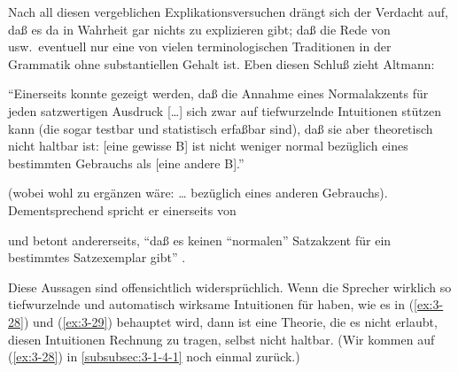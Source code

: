 \documentclass[output=paper]{langsci/langscibook}
\begin{document}
Nach all diesen vergeblichen Explikationsversuchen drängt sich der
Verdacht auf, daß es da in Wahrheit gar nichts zu explizieren gibt;
daß die Rede von  usw.\ eventuell nur eine von
vielen terminologischen Traditionen in der Grammatik ohne
substantiellen Gehalt ist. Eben diesen Schluß zieht Altmann:
\begin{exe}
	\ex \label{ex:3-28}
"`Einerseits konnte gezeigt werden, daß die Annahme eines Normalakzents
für jeden satzwertigen Ausdruck [\ldots] sich zwar auf tiefwurzelnde
Intuitionen stützen kann (die sogar testbar und statistisch erfaßbar
sind), daß sie aber theoretisch nicht haltbar ist: [eine gewisse
 B] ist nicht weniger normal bezüglich eines bestimmten
Gebrauchs als [eine andere  B]."' \citep[109]{Altmann1978}
\end{exe}
(wobei wohl zu ergänzen wäre: \ldots{} bezüglich eines anderen
Gebrauchs). Dementsprechend spricht er einerseits von
\begin{exe}
		\settowidth{}
\end{exe}
und betont andererseits, "`daß es keinen "`normalen"' Satzakzent für ein
bestimmtes Satzexemplar gibt"' \citep[95]{Altmann1978}.

\addlines
Diese Aussagen sind offensichtlich widersprüchlich. Wenn die Sprecher
wirklich so tiefwurzelnde und automatisch wirksame Intuitionen für
 haben, wie es in (\ref{ex:3-28}) und (\ref{ex:3-29}) behauptet wird,
dann ist eine Theorie, die es nicht erlaubt, diesen Intuitionen
Rechnung zu tragen, selbst nicht haltbar. (Wir kommen auf (\ref{ex:3-28}) in \ref{subsubsec:3-1-4-1} noch einmal zurück.)
\end{document}
